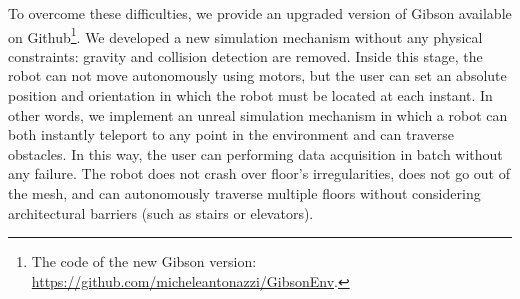 To overcome these difficulties, we provide an upgraded version of Gibson available on Github\footnote{The code of the new Gibson version: \url{https://github.com/micheleantonazzi/GibsonEnv}.}. We developed a new simulation mechanism without any physical constraints: gravity and collision detection are removed. Inside this stage, the robot can not move autonomously using motors, but the user can set an absolute position and orientation in which the robot must be located at each instant. In other words, we implement an unreal simulation mechanism in which a robot can both instantly teleport to any point in the environment and can traverse obstacles. In this way, the user can performing data acquisition in batch without any failure. The robot does not crash over floor's irregularities, does not go out of the mesh, and can autonomously traverse multiple floors without considering architectural barriers (such as stairs or elevators).



